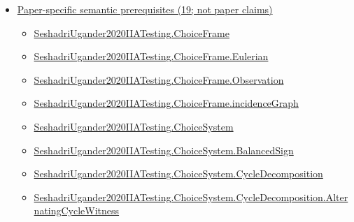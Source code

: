\documentclass[10pt]{article}
\begin{document}
\begin{itemize}[leftmargin=1.2em]
\begin{itemize}[leftmargin=1.2em]
\item \hyperlink{library-prerequisite-71929458e0903ffd}{Applied\allowbreak{}Modeling\allowbreak{}Lib.\allowbreak{}finite\allowbreak{}Cross\allowbreak{}Entropy\allowbreak{}Extended\allowbreak{}Range}
\item \hyperlink{library-prerequisite-99c551a488e46a7c}{Applied\allowbreak{}Modeling\allowbreak{}Lib.\allowbreak{}finite\allowbreak{}Entropy}
\end{itemize}
\item \hyperlink{paper-prerequisite-section-5ef5ef0364b6939c}{Paper-specific semantic prerequisites (19; not paper claims)}
\begin{itemize}[leftmargin=1.2em]
\item \hyperlink{paper-prerequisite-0b24d39c6f4d1898}{Seshadri\allowbreak{}Ugander2020\allowbreak{}IIA\allowbreak{}Testing.\allowbreak{}Choice\allowbreak{}Frame}
\item \hyperlink{paper-prerequisite-182958924bb3d984}{Seshadri\allowbreak{}Ugander2020\allowbreak{}IIA\allowbreak{}Testing.\allowbreak{}Choice\allowbreak{}Frame.\allowbreak{}Eulerian}
\item \hyperlink{paper-prerequisite-d450557e9618e377}{Seshadri\allowbreak{}Ugander2020\allowbreak{}IIA\allowbreak{}Testing.\allowbreak{}Choice\allowbreak{}Frame.\allowbreak{}Observation}
\item \hyperlink{paper-prerequisite-327de24bc89b726a}{Seshadri\allowbreak{}Ugander2020\allowbreak{}IIA\allowbreak{}Testing.\allowbreak{}Choice\allowbreak{}Frame.\allowbreak{}incidence\allowbreak{}Graph}
\item \hyperlink{paper-prerequisite-5dca52f4dfdd597a}{Seshadri\allowbreak{}Ugander2020\allowbreak{}IIA\allowbreak{}Testing.\allowbreak{}Choice\allowbreak{}System}
\item \hyperlink{paper-prerequisite-67c484d987d2d6ab}{Seshadri\allowbreak{}Ugander2020\allowbreak{}IIA\allowbreak{}Testing.\allowbreak{}Choice\allowbreak{}System.\allowbreak{}Balanced\allowbreak{}Sign}
\item \hyperlink{paper-prerequisite-7ec2ce004f72e29f}{Seshadri\allowbreak{}Ugander2020\allowbreak{}IIA\allowbreak{}Testing.\allowbreak{}Choice\allowbreak{}System.\allowbreak{}Cycle\allowbreak{}Decomposition}
\item \hyperlink{paper-prerequisite-7c17e7188aae79a0}{Seshadri\allowbreak{}Ugander2020\allowbreak{}IIA\allowbreak{}Testing.\allowbreak{}Choice\allowbreak{}System.\allowbreak{}Cycle\allowbreak{}Decomposition.\allowbreak{}Alternating\allowbreak{}Cycle\allowbreak{}Witness}

\end{itemize}
\end{itemize}
\end{document}
